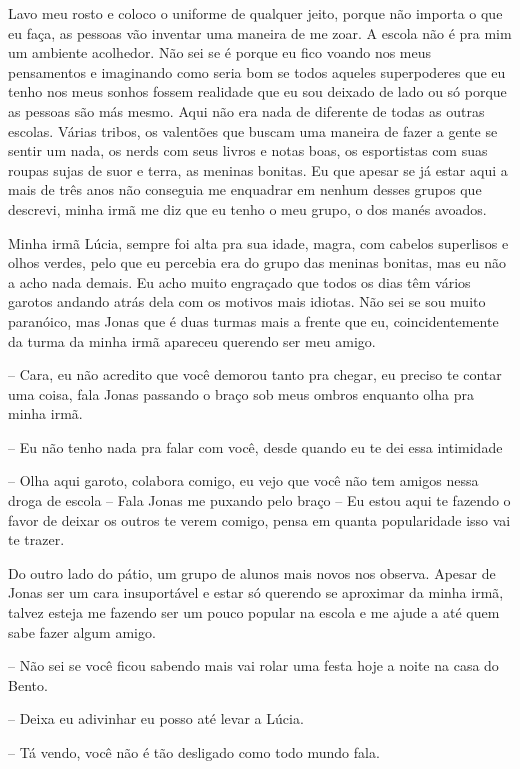 Lavo meu rosto e coloco o uniforme de qualquer jeito, porque não importa o que eu faça, as pessoas vão inventar uma maneira de me zoar. A escola não é pra mim um ambiente acolhedor. Não sei se é porque eu fico voando nos meus pensamentos e imaginando como seria bom se todos aqueles superpoderes que eu tenho nos meus sonhos fossem realidade que eu sou deixado de lado ou só porque as pessoas são más mesmo. Aqui não era nada de diferente de todas as outras escolas. Várias tribos, os valentões que buscam uma maneira de fazer a gente se sentir um nada, os nerds com seus livros e notas boas, os esportistas com suas roupas sujas de suor e terra, as meninas bonitas. Eu que apesar se já estar aqui a mais de três anos não conseguia me enquadrar em nenhum desses grupos que descrevi, minha irmã me diz que eu tenho o meu grupo, o dos manés avoados.

Minha irmã Lúcia, sempre foi alta pra sua idade, magra, com cabelos superlisos e olhos verdes, pelo que eu percebia era do grupo das meninas bonitas, mas eu não a acho nada demais. Eu acho muito engraçado que todos os dias têm vários garotos andando atrás dela com os motivos mais idiotas. Não sei se sou muito paranóico, mas Jonas que é duas turmas mais a frente que eu, coincidentemente da turma da minha irmã apareceu querendo ser meu amigo.

-- Cara, eu não acredito que você demorou tanto pra chegar, eu preciso te contar uma coisa, fala Jonas passando o braço sob meus ombros enquanto olha pra minha irmã.

-- Eu não tenho nada pra falar com você, desde quando eu te dei essa intimidade

-- Olha aqui garoto, colabora comigo, eu vejo que você não tem amigos nessa droga de escola -- Fala Jonas me puxando pelo braço -- Eu estou aqui te fazendo o favor de deixar os outros te verem comigo, pensa em quanta popularidade isso vai te trazer.

Do outro lado do pátio, um grupo de alunos mais novos nos observa. Apesar de Jonas ser um cara insuportável e estar só querendo se aproximar da minha irmã, talvez esteja me fazendo ser um pouco popular na escola e me ajude a até quem sabe fazer algum amigo.

-- Não sei se você ficou sabendo mais vai rolar uma festa hoje a noite na casa do Bento.

-- Deixa eu adivinhar eu posso até levar a Lúcia.

-- Tá vendo, você não é tão desligado como todo mundo fala.

